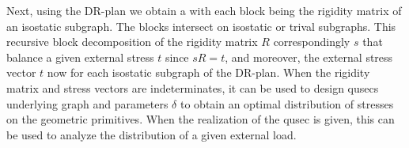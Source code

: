 Next, using the DR-plan we obtain a    
with each block being the rigidity matrix of 
an isostatic subgraph.
The blocks intersect on isostatic or trival subgraphs.
This recursive block decomposition of the rigidity matrix $R$ 
correspondingly 
$s$ that balance a given
external stress $t$ since $sR = t$, and moreover, the external stress vector
$t$ now  
for each isostatic subgraph of the DR-plan.
When the rigidity matrix and stress vectors are indeterminates, it can be
used to design  qusecs underlying graph and parameters $\delta$ to obtain an  
optimal distribution of stresses on the geometric primitives. 
When the realization of the qusec is given, this can be used to 
analyze the distribution of a  given external load.




